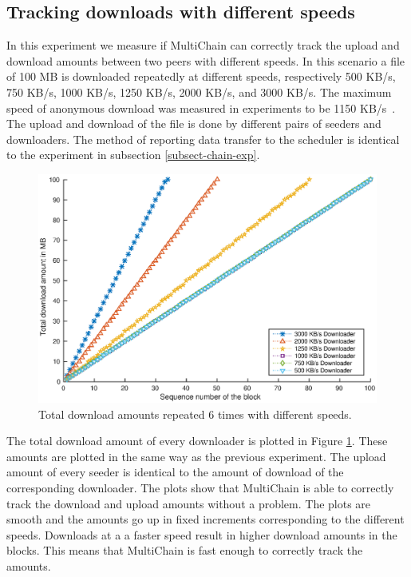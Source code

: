 \subsection{Tracking downloads with different speeds}
In this experiment we measure if MultiChain can correctly track the upload and download amounts
between two peers with different speeds.
In this scenario a file of 100 MB is downloaded repeatedly at different speeds,
respectively 500 KB/s, 750 KB/s, 1000 KB/s, 1250 KB/s, 2000 KB/s, and 3000 KB/s.
The maximum speed of anonymous download was measured in experiments to be 1150 KB/s~\cite{ruigrok-anonymous}.
The upload and download of the file is done by different pairs of seeders and downloaders.
The method of reporting data transfer to the scheduler is identical to the experiment in subsection \ref{subsect-chain-exp}.

\begin{figure}
\centerline{\includegraphics[scale=0.5]{experimentation/speeds/synthetic-simple-down.eps}}
\caption{Total download amounts repeated 6 times with different speeds.}
\label{fig:synthetic-simple-amounts}
\end{figure}

The total download amount of every downloader is plotted in Figure \ref{fig:synthetic-simple-amounts}.
These amounts are plotted in the same way as the previous experiment.
The upload amount of every seeder is identical to the amount of download of the corresponding downloader.
The plots show that MultiChain is able to correctly track the download and upload amounts without a problem.
The plots are smooth and the amounts go up in fixed increments corresponding to the different speeds.
Downloads at a a faster speed result in higher download amounts in the blocks.
This means that MultiChain is fast enough to correctly track the amounts.

